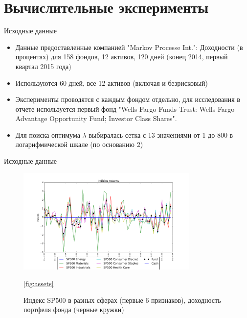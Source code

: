 \documentclass[11pt]{beamer}
\begin{document}
\section{Вычислительные эксперименты}
\begin{frame}{Исходные данные}
\begin{itemize}
\item Данные предоставленные компанией "Markov Processe Int.": Доходности (в процентах) для 158 фондов, 12 активов, 120 дней (конец 2014, первый квартал 2015 года)
\item Используются 60 дней, все 12 активов (включая и безрисковый)
\item Эксперименты проводятся с каждым фондом отдельно, для исследования в отчете используется первый фонд  "Wells Fargo Funds Trust: Wells Fargo Advantage Opportunity Fund; Investor Class Shares".
\item Для поиска оптимума $\lambda$ выбиралась сетка с 13 значениями от 1 до 800 в логарифмической шкале (по основанию 2) 
\end{itemize}
\end{frame}

\begin{frame}{Исходные данные}

\begin{figure}
\centering
\includegraphics[width=0.8\textwidth]{assets.png}
\caption{Индекс SP500 в разных сферах (первые 6 признаков), доходность портфеля фонда (черные кружки)}
\ref{fig:assets}
\end{figure}

\end{frame}
\end{document}
